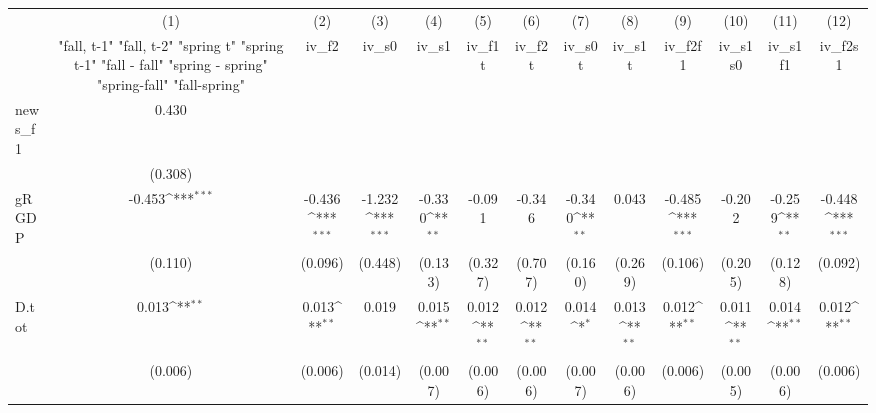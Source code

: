 {
\def\sym#1{\ifmmode^{#1}\else\(^{#1}\)\fi}
\begin{tabular}{l*{12}{c}}
\toprule
            &\multicolumn{1}{c}{(1)}&\multicolumn{1}{c}{(2)}&\multicolumn{1}{c}{(3)}&\multicolumn{1}{c}{(4)}&\multicolumn{1}{c}{(5)}&\multicolumn{1}{c}{(6)}&\multicolumn{1}{c}{(7)}&\multicolumn{1}{c}{(8)}&\multicolumn{1}{c}{(9)}&\multicolumn{1}{c}{(10)}&\multicolumn{1}{c}{(11)}&\multicolumn{1}{c}{(12)}\\
            &\multicolumn{1}{c}{  "fall, t-1" "fall, t-2" "spring t" "spring t-1"  "fall - fall" "spring - spring" "spring-fall" "fall-spring" }&\multicolumn{1}{c}{iv\_f2}&\multicolumn{1}{c}{iv\_s0}&\multicolumn{1}{c}{iv\_s1}&\multicolumn{1}{c}{iv\_f1t}&\multicolumn{1}{c}{iv\_f2t}&\multicolumn{1}{c}{iv\_s0t}&\multicolumn{1}{c}{iv\_s1t}&\multicolumn{1}{c}{iv\_f2f1}&\multicolumn{1}{c}{iv\_s1s0}&\multicolumn{1}{c}{iv\_s1f1}&\multicolumn{1}{c}{iv\_f2s1}\\
\midrule
news\_f1     &       0.430         &                     &                     &                     &                     &                     &                     &                     &                     &                     &                     &                     \\
            &     (0.308)         &                     &                     &                     &                     &                     &                     &                     &                     &                     &                     &                     \\
\addlinespace
gRGDP       &      -0.453\sym{***}&      -0.436\sym{***}&      -1.232\sym{***}&      -0.330\sym{**} &      -0.091         &      -0.346         &      -0.340\sym{**} &       0.043         &      -0.485\sym{***}&      -0.202         &      -0.259\sym{**} &      -0.448\sym{***}\\
            &     (0.110)         &     (0.096)         &     (0.448)         &     (0.133)         &     (0.327)         &     (0.707)         &     (0.160)         &     (0.269)         &     (0.106)         &     (0.205)         &     (0.128)         &     (0.092)         \\
\addlinespace
D.tot       &       0.013\sym{**} &       0.013\sym{**} &       0.019         &       0.015\sym{**} &       0.012\sym{**} &       0.012\sym{**} &       0.014\sym{*}  &       0.013\sym{**} &       0.012\sym{**} &       0.011\sym{**} &       0.014\sym{**} &       0.012\sym{**} \\
            &     (0.006)         &     (0.006)         &     (0.014)         &     (0.007)         &     (0.006)         &     (0.006)         &     (0.007)         &     (0.006)         &     (0.006)         &     (0.005)         &     (0.006)         &     (0.006)         \\

\end{tabular}}
